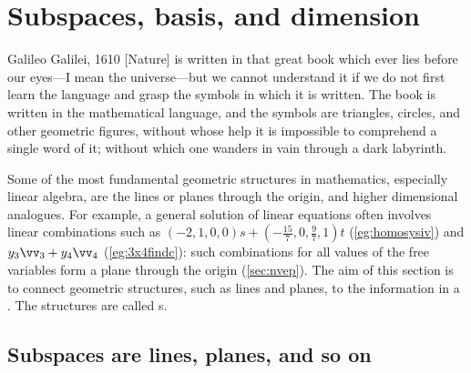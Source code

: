 
\section{Subspaces, basis, and dimension}
\label{sec:sbd}
\secttoc

\begin{quoted}{Galileo Galilei, 1610}
[Nature] is written in that great book which ever lies before our eyes---I mean the universe---but we cannot understand it if we do not first learn the language and grasp the symbols in which it is written. 
The book is written in the mathematical language, and the symbols are triangles, circles, and other geometric figures, without whose help it is impossible to comprehend a single word of it; without which one wanders in vain through a dark labyrinth.
\end{quoted}


Some of the most fundamental geometric structures in mathematics, especially linear algebra, are the lines or planes through the origin, and higher dimensional analogues.
For example, a general solution of linear equations often involves linear combinations such as \((-2,1,0,0)s+(-\frac{15}7,0,\frac97,1)t\) (\cref{eg:homosysiv}) and \(y_3\vv_3+y_4\vv_4\) (\cref{eg:3x4findc}): such combinations for all values of the free variables form a plane through the origin (\cref{sec:nvep}).
The aim of this section is to connect geometric structures, such as lines and planes, to the information in a .
The structures are called s.


\subsection{Subspaces are lines, planes, and so on}

